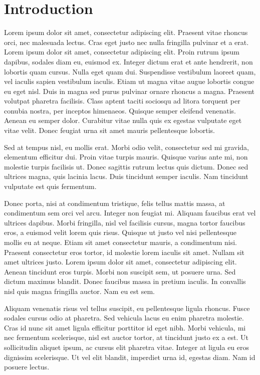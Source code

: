\chapter*{Introduction}

Lorem ipsum dolor sit amet, consectetur adipiscing elit. Praesent vitae rhoncus orci, nec malesuada lectus. Cras eget justo nec nulla fringilla pulvinar et a erat. Lorem ipsum dolor sit amet, consectetur adipiscing elit. Proin rutrum ipsum dapibus, sodales diam eu, euismod ex. Integer dictum erat et ante hendrerit, non lobortis quam cursus. Nulla eget quam dui. Suspendisse vestibulum laoreet quam, vel iaculis sapien vestibulum iaculis. Etiam ut magna vitae augue lobortis congue eu eget nisl. Duis in magna sed purus pulvinar ornare rhoncus a magna. Praesent volutpat pharetra facilisis. Class aptent taciti sociosqu ad litora torquent per conubia nostra, per inceptos himenaeos. Quisque semper eleifend venenatis. Aenean eu semper dolor. Curabitur vitae nulla quis ex egestas vulputate eget vitae velit. Donec feugiat urna sit amet mauris pellentesque lobortis.

Sed at tempus nisl, eu mollis erat. Morbi odio velit, consectetur sed mi gravida, elementum efficitur dui. Proin vitae turpis mauris. Quisque varius ante mi, non molestie turpis facilisis ut. Donec sagittis rutrum lectus quis dictum. Donec sed ultrices magna, quis lacinia lacus. Duis tincidunt semper iaculis. Nam tincidunt vulputate est quis fermentum.

Donec porta, nisi at condimentum tristique, felis tellus mattis massa, at condimentum sem orci vel arcu. Integer non feugiat mi. Aliquam faucibus erat vel ultrices dapibus. Morbi fringilla, nisl vel facilisis cursus, magna tortor faucibus eros, a euismod velit lorem quis risus. Quisque ut justo vel nisi pellentesque mollis eu at neque. Etiam sit amet consectetur mauris, a condimentum nisi. Praesent consectetur eros tortor, id molestie lorem iaculis sit amet. Nullam sit amet ultrices justo. Lorem ipsum dolor sit amet, consectetur adipiscing elit. Aenean tincidunt eros turpis. Morbi non suscipit sem, ut posuere urna. Sed dictum maximus blandit. Donec faucibus massa in pretium iaculis. In convallis nisl quis magna fringilla auctor. Nam eu est sem.

Aliquam venenatis risus vel tellus suscipit, eu pellentesque ligula rhoncus. Fusce sodales cursus odio at pharetra. Sed vehicula lacus eu enim pharetra molestie. Cras id nunc sit amet ligula efficitur porttitor id eget nibh. Morbi vehicula, mi nec fermentum scelerisque, nisl est auctor tortor, at tincidunt justo ex a est. Ut sollicitudin aliquet ipsum, ac cursus elit pharetra vitae. Integer at ligula eu eros dignissim scelerisque. Ut vel elit blandit, imperdiet urna id, egestas diam. Nam id posuere lectus.

